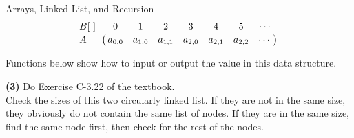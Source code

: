 \begin{homeworkProblem}{Arrays, Linked List, and Recursion}
    \[
        \bordermatrix{B[~]   & 0       & 1       & 2       & 3       & 4       & 5       & \cdots   \cr
                      A      & a_{0,0} & a_{1,0} & a_{1,1} & a_{2,0} & a_{2,1} & a_{2,2} & \cdots   \cr}
    \]

    Functions below show how to input or output the value in this data structure. 

    \begin{algorithm}[]
        \begin{algorithmic}[1]
            \EndFunction{}
        \end{algorithmic}
        \caption{Get the value from this matrix}
    \end{algorithm}

    \begin{algorithm}[]
        \begin{algorithmic}[1]
                \State{\Return{}}
            \EndFunction{}
        \end{algorithmic}
        \caption{Put the value in this matrix}
    \end{algorithm}

    \pagebreak

    \textbf{(3)} Do Exercise C-3.22 of the textbook.
    \\

    Check the sizes of this two circularly linked list. If they are not in the same size,
    they obviously do not contain the same list of nodes. If they are in the same size, 
    find the same node first, then check for the rest of the nodes.
    
    \begin{algorithm}[]
        \begin{algorithmic}[1]
                                \EndIf
                            \EndIf
                        \EndIf
                    \EndWhile
                \EndIf
            \EndFunction{}
        \end{algorithmic}
        \caption{Check whether the two circularly linked lists are same or not}
    \end{algorithm}


\end{homeworkProblem}
